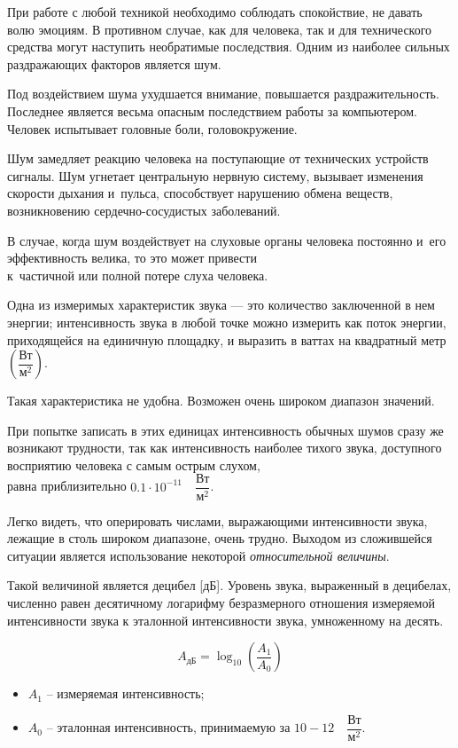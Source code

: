 При работе с любой техникой необходимо соблюдать спокойствие, 
не давать волю эмоциям. В противном случае, как для человека, 
так и для технического средства могут наступить необратимые последствия.
Одним из наиболее сильных раздражающих факторов является шум.

Под воздействием шума ухудшается внимание, повышается раздражительность. 
Последнее является весьма опасным последствием работы за компьютером.
Человек испытывает головные боли, головокружение. 

Шум замедляет реакцию человека на поступающие от технических устройств сигналы. 
Шум угнетает центральную нервную систему, вызывает 
изменения скорости дыхания и~пульса, способствует нарушению обмена веществ,  \\
возникновению сердечно-сосудистых заболеваний. 

В случае, когда шум воздействует на слуховые органы человека постоянно 
и~его эффективность велика, то это может привести \\
к~частичной или полной потере слуха человека.

Одна из измеримых характеристик звука --- это количество заключенной в нем
энергии; интенсивность звука в любой точке можно измерить как поток
энергии, приходящейся на единичную площадку, и выразить в
ваттах на квадратный метр $\left( \dfrac{\text{Вт}}{\text{м}^2} \right) $. 

Такая характеристика не удобна. Возможен очень широком диапазон значений. 

При попытке записать в этих единицах интенсивность обычных шумов сразу
же возникают трудности, так как интенсивность наиболее тихого звука,
доступного восприятию человека с самым острым слухом, \\
равна приблизительно $ 0.1 \cdot 10^{-11} \quad \dfrac{\text{Вт}}{\text{м}^2}$. 

Легко видеть, что оперировать числами, выражающими интенсивности звука,
лежащие в столь широком диапазоне, очень трудно. Выходом из сложившейся
ситуации является использование некоторой \textit{относительной величины}. 

Такой величиной является децибел [дБ]. Уровень звука, выраженный в децибелах,
численно равен десятичному логарифму безразмерного отношения измеряемой
интенсивности звука к эталонной интенсивности звука, умноженному на
десять.

\[
	A_{\text{дБ}} = \log_{10} \left( \dfrac{A_1}{A_0} \right)
\]

\begin{itemize}
	\item  $A_1$ – измеряемая интенсивность;
	\item  $A_0$ – эталонная интенсивность, принимаемую за $ 10-12  \quad \dfrac{\text{Вт}}{\text{м}^2}$.
\end{itemize}

